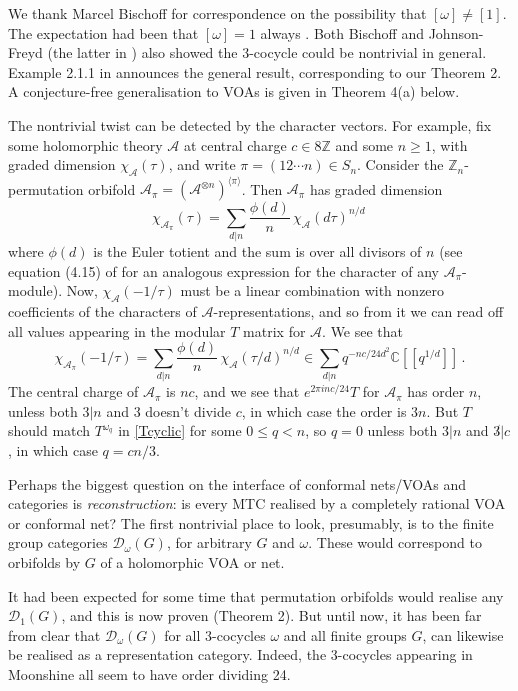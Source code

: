 \documentclass[12pt]{article}
\numberwithin{equation}{section}
\def\cA            {{\mathcal{A}}}
\def\cD            {{\mathcal{D}}}
\def\bbC           {\mathbb{C}}
\def\bbZ           {\mathbb{Z}}
\begin{document}
We thank Marcel Bischoff for correspondence on the possibility that $[\omega]\ne [1]$. The expectation had been that $[\omega]=1$ always \cite{Mug1,Dav2}. Both Bischoff and  Johnson-Freyd (the latter in \cite{JF})  also showed the 3-cocycle could be nontrivial in general. Example 2.1.1 in \cite{JF} announces the general result, corresponding to our Theorem 2. A conjecture-free generalisation to VOAs is given in Theorem 4(a) below.

The nontrivial twist can be detected by the character vectors.
For example, fix some holomorphic theory $\cA$ at central charge $c\in 8\bbZ$ and some $n\ge 1$, with graded dimension $\chi_\cA(\tau)$, and write $\pi=(12\cdots n)\in S_n$. Consider the $\bbZ_n$-permutation orbifold $\cA_\pi=(\cA^{\otimes n})^{\langle \pi\rangle}$. 
Then $\cA_\pi$ has graded dimension 
\begin{equation}\label{permorbchar}\chi_{\cA_\pi}(\tau)=\sum_{d|n}\frac{\phi(d)}{n}\,\chi_\cA(d\tau)^{n/d}\,\end{equation}
where $\phi(d)$ is the Euler totient and the sum is over all divisors of $n$ (see equation (4.15) of \cite{BHS} for an analogous expression for the character of any $\cA_\pi$-module). Now, $\chi_\cA(-1/\tau)$ must be a linear combination with nonzero coefficients of the characters of $\cA$-representations, and so from it we can read off all values appearing in the modular $T$ matrix for $\cA$. We see that 
$$\chi_{\cA_\pi}(-1/\tau)=\sum_{d|n}\frac{\phi(d)}{n}\,\chi_\cA(\tau/d)^{n/d}\in \sum_{d|n}q^{-nc/24d^2}\bbC[[q^{1/d}]]\,.$$
The central charge of $\cA_\pi$ is $nc$, and we see that $e^{2\pi i nc/24}T$ for $\cA_\pi$ has order $n$, unless 
both $3|n$ and $3$ doesn't divide $c$, in which case the order is $3n$. But $T$ should match $T^{\omega_q}$ in \eqref{Tcyclic} for some $0\le q<n$, so $q=0$ unless both $3|n$ and $3\!{\not{}|c}$,
in which case $q=cn/3$. 

Perhaps the biggest question on the interface of conformal nets/VOAs and categories is \textit{reconstruction}: is every MTC
realised by a completely rational VOA or  conformal net? The first nontrivial place to look, presumably, is to the finite group categories 
$\cD_\omega(G)$, for arbitrary $G$ and $\omega$. These would correspond to orbifolds by
$G$ of a holomorphic VOA or net. 

It had been expected for some time that permutation orbifolds would realise
any $\cD_1(G)$, and this is now proven (Theorem 2).
But until now, it has been far from clear that $\cD_\omega(G)$ for all 3-cocycles $\omega$ and all finite groups $G$,
can likewise be realised as a representation category. Indeed, the 3-cocycles appearing in Moonshine
all seem to have order dividing 24. 
\end{document}
